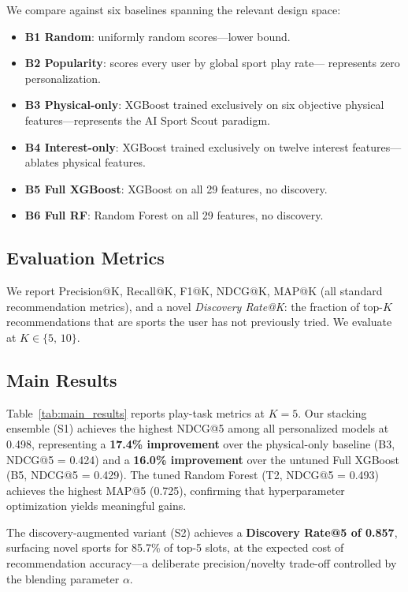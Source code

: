 \documentclass[conference]{IEEEtran}
\begin{document}
We compare against six baselines spanning the relevant design space:

\begin{itemize}
  \item \textbf{B1 Random}: uniformly random scores---lower bound.
  \item \textbf{B2 Popularity}: scores every user by global sport play rate---
        represents zero personalization.
  \item \textbf{B3 Physical-only}: XGBoost trained exclusively on six
        objective physical features---represents the AI Sport Scout paradigm.
  \item \textbf{B4 Interest-only}: XGBoost trained exclusively on twelve
        interest features---ablates physical features.
  \item \textbf{B5 Full XGBoost}: XGBoost on all 29 features, no discovery.
  \item \textbf{B6 Full RF}: Random Forest on all 29 features, no discovery.
\end{itemize}

\subsection{Evaluation Metrics}

We report Precision@K, Recall@K, F1@K, NDCG@K, MAP@K (all standard
recommendation metrics), and a novel \textit{Discovery Rate@K}: the fraction
of top-$K$ recommendations that are sports the user has not previously tried.
We evaluate at $K \in \{5,\, 10\}$.

\subsection{Main Results}

Table~\ref{tab:main_results} reports play-task metrics at $K=5$.
Our stacking ensemble (S1) achieves the highest NDCG@5 among all
personalized models at 0.498, representing a \textbf{17.4\% improvement}
over the physical-only baseline (B3, NDCG@5 = 0.424) and a \textbf{16.0\%
improvement} over the untuned Full XGBoost (B5, NDCG@5 = 0.429).
The tuned Random Forest (T2, NDCG@5 = 0.493) achieves the highest MAP@5
(0.725), confirming that hyperparameter optimization yields meaningful gains.

The discovery-augmented variant (S2) achieves a \textbf{Discovery Rate@5 of
0.857}, surfacing novel sports for 85.7\% of top-5 slots, at the expected
cost of recommendation accuracy---a deliberate precision/novelty trade-off
controlled by the blending parameter $\alpha$.
\end{document}
